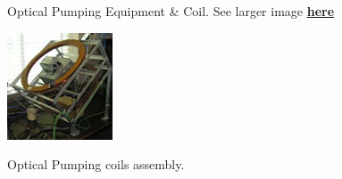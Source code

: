 \documentclass{../lab}
\begin{document}
\begin{figure}[h]
\begin{minipage}{0.32\textwidth}
    \caption{Optical Pumping Equipment \& Coil. See larger image \href{http://experimentationlab.berkeley.edu/sites/default/files/images/OPT_3548.jpg}{\textbf{here}}}
\end{minipage}
\begin{minipage}{0.32\textwidth}
    \href{http://experimentationlab.berkeley.edu/sites/default/files/images/OPT_Coils_Top_t9743.jpg}{\includegraphics[width=\linewidth,keepaspectratio]{images/OPT_Top_t9743.jpg}}
    \caption{Optical Pumping coils assembly.}
\end{minipage}
\end{figure}
\end{document}
